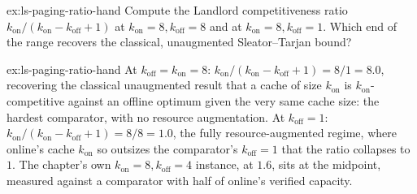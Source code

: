 \documentclass[11pt,a4paper]{article}
\theoremstyle{definition}
\theoremstyle{plain}
\begin{document}
\begin{pdexercise}[kind=Check,rating=1]{ex:ls-paging-ratio-hand}
Compute the Landlord competitiveness ratio $k_{\mathrm{on}}/(k_{\mathrm{on}}-k_{\mathrm{off}}+1)$ at $k_{\mathrm{on}}=8,k_{\mathrm{off}}=8$ and at
$k_{\mathrm{on}}=8,k_{\mathrm{off}}=1$. Which end of the range recovers the classical, unaugmented
Sleator--Tarjan bound?
\end{pdexercise}
\begin{pdsolution}{ex:ls-paging-ratio-hand}
At $k_{\mathrm{off}}=k_{\mathrm{on}}=8$: $k_{\mathrm{on}}/(k_{\mathrm{on}}-k_{\mathrm{off}}+1)=8/1=8.0$, recovering the classical unaugmented result that a cache of size $k_{\mathrm{on}}$ is $k_{\mathrm{on}}$-competitive against an offline optimum given the very same cache size: the hardest comparator, with no resource augmentation. At $k_{\mathrm{off}}=1$: $k_{\mathrm{on}}/(k_{\mathrm{on}}-k_{\mathrm{off}}+1)=8/8=1.0$, the fully resource-augmented regime, where online's cache $k_{\mathrm{on}}$ so outsizes the comparator's $k_{\mathrm{off}}=1$ that the ratio collapses to $1$. The chapter's own $k_{\mathrm{on}}=8,k_{\mathrm{off}}=4$ instance, at $1.6$, sits at the midpoint, measured against a comparator with half of online's verified capacity.
\end{pdsolution}

\end{document}
